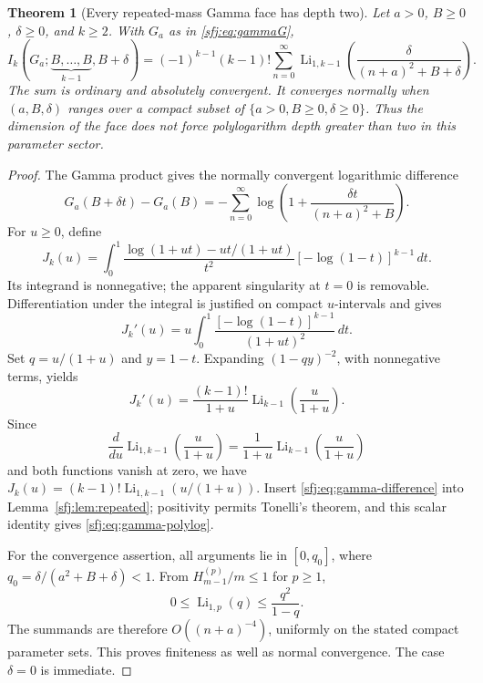 \documentclass[11pt,letterpaper]{article}
\numberwithin{equation}{section}
\newtheorem{theorem}{Theorem}[section]
\theoremstyle{definition}
\theoremstyle{remark}
\DeclareMathOperator{\Li}{Li}
\begin{document}
\begin{theorem}[Every repeated-mass Gamma face has depth two]
\label{sfj:thm:gamma-polylog}
Let $a>0$, $B\ge0$, $\delta\ge0$, and $k\ge2$.  With $G_a$ as in
\eqref{sfj:eq:gammaG},
\begin{equation}\label{sfj:eq:gamma-polylog}
 \boxed{\displaystyle
 I_k(G_a;\underbrace{B,\ldots,B}_{k-1},B+\delta)
  =(-1)^{k-1}(k-1)!
     \sum_{n=0}^\infty
       \Li_{1,k-1}\!\left(
             \frac{\delta}{(n+a)^2+B+\delta}\right).}
\end{equation}
The sum is ordinary and absolutely convergent.  It converges normally
when $(a,B,\delta)$ ranges over a compact subset of
$\{a>0,B\ge0,\delta\ge0\}$.  Thus the dimension of the face does
not force polylogarithm depth greater than two in this parameter sector.
\end{theorem}

\begin{proof}
The Gamma product gives the normally convergent logarithmic difference
\begin{equation}\label{sfj:eq:gamma-difference}
 G_a(B+\delta t)-G_a(B)
       =-\sum_{n=0}^\infty
          \log\left(1+\frac{\delta t}{(n+a)^2+B}\right).
\end{equation}
For $u\ge0$, define
\[
 J_k(u)=\int_0^1
  \frac{\log(1+ut)-ut/(1+ut)}{t^2}
                            [-\log(1-t)]^{k-1}\,dt.
\]
Its integrand is nonnegative; the apparent singularity at $t=0$ is
removable.  Differentiation under the integral is justified on compact
$u$-intervals and gives
\[
 J_k'(u)=u\int_0^1\frac{[-\log(1-t)]^{k-1}}{(1+ut)^2}\,dt.
\]
Set $q=u/(1+u)$ and $y=1-t$.  Expanding $(1-qy)^{-2}$, with
nonnegative terms, yields
\[
 J_k'(u)
  =\frac{(k-1)!}{1+u}\Li_{k-1}\!\left(\frac{u}{1+u}\right).
\]
Since
\[
 \frac{d}{du}\Li_{1,k-1}\!\left(\frac{u}{1+u}\right)
      =\frac1{1+u}\Li_{k-1}\!\left(\frac{u}{1+u}\right)
\]
and both functions vanish at zero, we have
$J_k(u)=(k-1)!\Li_{1,k-1}(u/(1+u))$.
Insert \eqref{sfj:eq:gamma-difference} into
Lemma~\ref{sfj:lem:repeated}; positivity permits Tonelli's theorem,
and this scalar identity gives \eqref{sfj:eq:gamma-polylog}.

For the convergence assertion, all arguments lie in $[0,q_0]$, where
$q_0=\delta/(a^2+B+\delta)<1$.  From
$H_{m-1}^{(p)}/m\le1$ for $p\ge1$,
\[
 0\le\Li_{1,p}(q)\le\frac{q^2}{1-q}.
\]
The summands are therefore $O((n+a)^{-4})$, uniformly on the stated
compact parameter sets.  This proves finiteness as well as normal
convergence.  The case $\delta=0$ is immediate.
\end{proof}
\end{document}

